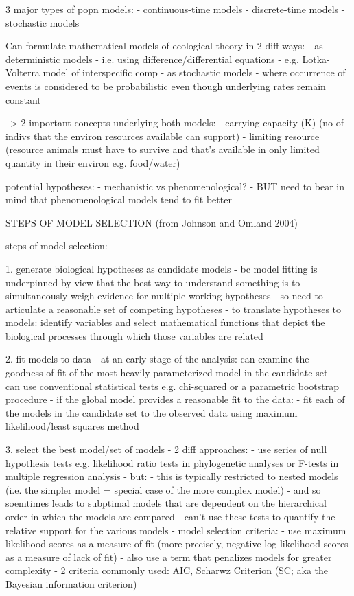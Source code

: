 \documentclass[11pt]{article}
\begin{document}
	3 major types of popn models:
	- continuous-time models
	- discrete-time models
	- stochastic models
	
	Can formulate mathematical models of ecological theory in 2 diff ways:
	- as deterministic models
	- i.e. using difference/differential equations
	- e.g. Lotka-Volterra model of interspecific comp
	- as stochastic models
	- where occurrence of events is considered to be probabilistic even though underlying rates remain constant
	
	
	
	--> 2 important concepts underlying both models:
	- carrying capacity (K) (no of indivs that the environ resources available can support)
	- limiting resource (resource animals must have to survive and that's available in only limited quantity in their environ e.g. food/water)
	
	
	
	
	
	
	
	potential hypotheses:
	- mechanistic vs phenomenological?
	- BUT need to bear in mind that phenomenological models tend to fit better
	
	
	
	
	
	STEPS OF MODEL SELECTION (from Johnson and Omland 2004)
	
	steps of model selection:
	
	1. generate biological hypotheses as candidate models
	- bc model fitting is underpinned by view that the best way to understand something is to simultaneously weigh evidence for multiple working hypotheses
	- so need to articulate a reasonable set of competing hypotheses
	- to translate hypotheses to models: identify variables and select mathematical functions that depict the biological processes through which those variables are related
	
	2. fit models to data
	- at an early stage of the analysis: can examine the goodness-of-fit of the most heavily parameterized model in the candidate set
	- can use conventional statistical tests e.g. chi-squared or a parametric bootstrap procedure
	- if the global model provides a reasonable fit to the data:
	- fit each of the models in the candidate set to the observed data using maximum likelihood/least squares method
	
	
	3. select the best model/set of models
	- 2 diff approaches:
	- use series of null hypothesis tests e.g. likelihood ratio tests in phylogenetic analyses or F-tests in multiple regression analysis
	- but: 
	- this is typically restricted to nested models (i.e. the simpler model = special case of the more complex model)
	- and so soemtimes leads to subptimal models that are dependent on the hierarchical order in which the models are compared
	- can't use these tests to quantify the relative support for the various models
	- model selection criteria:
	- use maximum likelihood scores as a measure of fit (more precisely, negative log-likelihood scores as a measure of lack of fit)
	- also use a term that penalizes models for greater complexity
	- 2 criteria commonly used: AIC, Scharwz Criterion (SC; aka the Bayesian information criterion)
	
\end{document}
